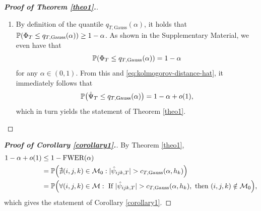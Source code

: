 \documentclass[a4paper,12pt]{article}
\numberwithin{equation}{section}
\begin{document}
\begin{proof}[\textnormal{\textbf{Proof of Theorem \ref{theo1}.}}]
\begin{enumerate}[label=\textit{Step \arabic*.}, leftmargin=0cm, itemindent=1.45cm]
\begin{align*} 
 & \sup_{q \in \reals} \Big| \pr \Big( \Phi_T \le q \pm r_T \Big) - \pr \big( \Phi_T \le q \big) \Big| \\*
 & = \sup_{\boldsymbol{q} \in \reals^p} \Big| \pr \Big( \Big|\frac{1}{\sqrt{T}} \sum_{t=1}^T \boldsymbol{W}_t\Big| \le \boldsymbol{q} \pm r_T \Big) - \pr \Big( \Big|\frac{1}{\sqrt{T}} \sum_{t=1}^T \boldsymbol{W}_t\Big| \le \boldsymbol{q} \Big) \Big| \le C r_T \sqrt{\log(2 p)}, 
\end{align*}
where $C$ is a constant that depends only on the parameter $\delta$ defined in condition (a) of Proposition \ref{prop:Chernozhukov}.


\item By definition of the quantile $q_{T,\text{Gauss}}(\alpha)$, it holds that $\mathbb{P}(\Phi_T \le q_{T,\text{Gauss}}(\alpha)) \ge 1-\alpha$. As shown in the Supplementary Material, we even have that  
\begin{equation}\label{eq:quant-exact}
\mathbb{P}(\Phi_T \le q_{T,\text{Gauss}}(\alpha)) = 1-\alpha
\end {equation} 
for any $\alpha \in (0,1)$. From this and \eqref{eq:kolmogorov-distance-hat}, it immediately follows that  
\begin{equation}\label{eq:probbound-Psihat}
\mathbb{P} \big( \hat{\Psi}_T \le q_{T,\text{Gauss}}(\alpha) \big) = 1 - \alpha + o(1), 
\end{equation}
which in turn yields the statement of Theorem \ref{theo1}. \qedhere


\end{enumerate}
\end{proof}


\begin{proof}[\textnormal{\textbf{Proof of Corollary \ref{corollary1}.}}]
By Theorem \ref{theo1}, 
\begin{align*}
1 - \alpha + o(1) 
 & \le 1 - \textnormal{FWER}(\alpha) \\
 & = \mathbb{P} \Big( \nexists (i,j,k) \in \mathcal{M}_0: |\hat{\psi}_{ijk,T}| > c_{T,\textnormal{Gauss}}(\alpha,h_k) \Big) \\
 & = \mathbb{P}\Big( \forall (i,j,k) \in \mathcal{M}: \text{ If } |\hat{\psi}_{ijk,T}| > c_{T,\textnormal{Gauss}}(\alpha,h_k), \text{ then } (i,j,k) \notin \mathcal{M}_0 \Big),
\end{align*}
which gives the statement of Corollary \ref{corollary1}.
\end{proof}




{\small
\setlength{\bibsep}{0.45em}
}
\end{document}
